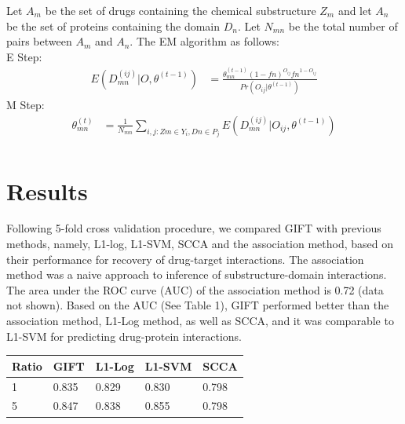 \documentclass[a0,portrait]{a0poster}
\begin{document}
\begin{multicols}{2}
Let $A_m$ be the set of drugs containing the chemical substructure $Z_m$ and let $A_n$ be the set of proteins containing the domain $D_n$. Let $N_{mn}$ be the total number of pairs between $A_m$ and $A_n$. The EM algorithm as follows:\\
E Step:
\begin{equation}
  \begin{aligned}
    E(D_{mn}^{(ij)}|O,\theta^{(t-1)})
    &=\frac{\theta_{mn}^{(t-1)}(1-\textit{fn})^{O_{ij}}\textit{fn}^{1-O_{ij}}}{Pr(O_{ij}|\theta^{(t-1)})}
  \end{aligned}
\end{equation}
M Step:
\begin{equation}
\begin{aligned}
\theta_{mn}^{(t)}
&=\frac{1}{N_{mn}} \sum_{i,j: Zm\in Y_i, Dn\in P_j}E(D_{mn}^{(ij)}|O_{ij},\theta^{(t-1)})\\
\end{aligned}
\end{equation}
\section*{Results}

Following 5-fold cross validation procedure, we compared GIFT with previous methods, namely, L1-log, L1-SVM, SCCA and the association method, based on their performance for recovery of drug-target interactions. The association method was a naive approach to inference of  substructure-domain interactions. The area under the ROC curve (AUC) of the association method is 0.72 (data not shown). Based on the AUC (See Table 1), GIFT performed better than the association method, L1-Log method, as well as SCCA, and it was comparable to L1-SVM for predicting drug-protein interactions.
\begin{center}\vspace{1cm} %
\begin{tabular}{l l l l l}
\toprule
\textbf{Ratio} & \textbf{GIFT} & \textbf{L1-Log} & \textbf{L1-SVM} & \textbf{SCCA}\\
\midrule
1 & 0.835 & 0.829 & 0.830 & 0.798 \\
5 & 0.847 & 0.838 & 0.855 & 0.798 \\
\bottomrule
\end{tabular}
\end{center}\vspace{1cm}


\end{multicols}
\end{document}
